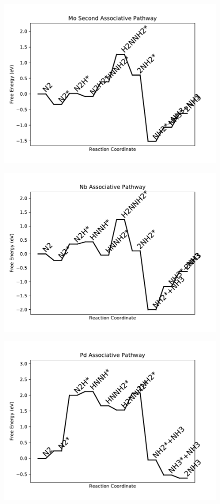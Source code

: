\begin{figure}
\includegraphics[width=0.8\linewidth]{data/plots/Mo_associative_2.pdf}
\label{fig:Mo_associative_2}
\end{figure}

\begin{figure}
\includegraphics[width=0.8\linewidth]{data/plots/Nb_associative.pdf}
\label{fig:Nb_associative}
\end{figure}

\begin{figure}
\includegraphics[width=0.8\linewidth]{data/plots/Pd_associative.pdf}
\label{fig:Pd_associative}
\end{figure}

